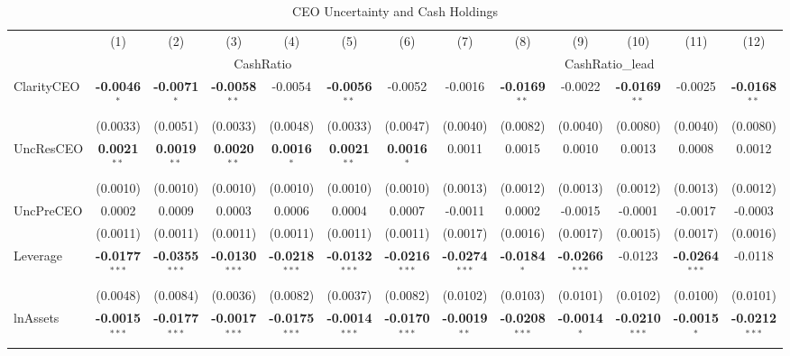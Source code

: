 \documentclass[11pt,a4paper]{article}
\begin{document}
\begin{table}[htbp]
\centering
\caption{CEO Uncertainty and Cash Holdings}
\label{tab:h1_ceo2_decomp}
\scriptsize
\begin{tabular}{lcccccccccccc}
\toprule
 & (1) & (2) & (3) & (4) & (5) & (6) & (7) & (8) & (9) & (10) & (11) & (12) \\
 & \multicolumn{6}{c}{CashRatio} & \multicolumn{6}{c}{CashRatio\_lead} \\
\cmidrule(lr){2-7} \cmidrule(lr){8-13}
\midrule
ClarityCEO & \textbf{-0.0046}$^{*}$ & \textbf{-0.0071}$^{*}$ & \textbf{-0.0058}$^{**}$ & -0.0054 & \textbf{-0.0056}$^{**}$ & -0.0052 & -0.0016 & \textbf{-0.0169}$^{**}$ & -0.0022 & \textbf{-0.0169}$^{**}$ & -0.0025 & \textbf{-0.0168}$^{**}$ \\
 & (0.0033) & (0.0051) & (0.0033) & (0.0048) & (0.0033) & (0.0047) & (0.0040) & (0.0082) & (0.0040) & (0.0080) & (0.0040) & (0.0080) \\
UncResCEO & \textbf{0.0021}$^{**}$ & \textbf{0.0019}$^{**}$ & \textbf{0.0020}$^{**}$ & \textbf{0.0016}$^{*}$ & \textbf{0.0021}$^{**}$ & \textbf{0.0016}$^{*}$ & 0.0011 & 0.0015 & 0.0010 & 0.0013 & 0.0008 & 0.0012 \\
 & (0.0010) & (0.0010) & (0.0010) & (0.0010) & (0.0010) & (0.0010) & (0.0013) & (0.0012) & (0.0013) & (0.0012) & (0.0013) & (0.0012) \\
UncPreCEO & 0.0002 & 0.0009 & 0.0003 & 0.0006 & 0.0004 & 0.0007 & -0.0011 & 0.0002 & -0.0015 & -0.0001 & -0.0017 & -0.0003 \\
 & (0.0011) & (0.0011) & (0.0011) & (0.0011) & (0.0011) & (0.0011) & (0.0017) & (0.0016) & (0.0017) & (0.0015) & (0.0017) & (0.0016) \\
\midrule
Leverage & \textbf{-0.0177}$^{***}$ & \textbf{-0.0355}$^{***}$ & \textbf{-0.0130}$^{***}$ & \textbf{-0.0218}$^{***}$ & \textbf{-0.0132}$^{***}$ & \textbf{-0.0216}$^{***}$ & \textbf{-0.0274}$^{***}$ & \textbf{-0.0184}$^{*}$ & \textbf{-0.0266}$^{***}$ & -0.0123 & \textbf{-0.0264}$^{***}$ & -0.0118 \\
 & (0.0048) & (0.0084) & (0.0036) & (0.0082) & (0.0037) & (0.0082) & (0.0102) & (0.0103) & (0.0101) & (0.0102) & (0.0100) & (0.0101) \\
lnAssets & \textbf{-0.0015}$^{***}$ & \textbf{-0.0177}$^{***}$ & \textbf{-0.0017}$^{***}$ & \textbf{-0.0175}$^{***}$ & \textbf{-0.0014}$^{***}$ & \textbf{-0.0170}$^{***}$ & \textbf{-0.0019}$^{**}$ & \textbf{-0.0208}$^{***}$ & \textbf{-0.0014}$^{*}$ & \textbf{-0.0210}$^{***}$ & \textbf{-0.0015}$^{*}$ & \textbf{-0.0212}$^{***}$ \\

\end{tabular}
\end{table}
\end{document}
